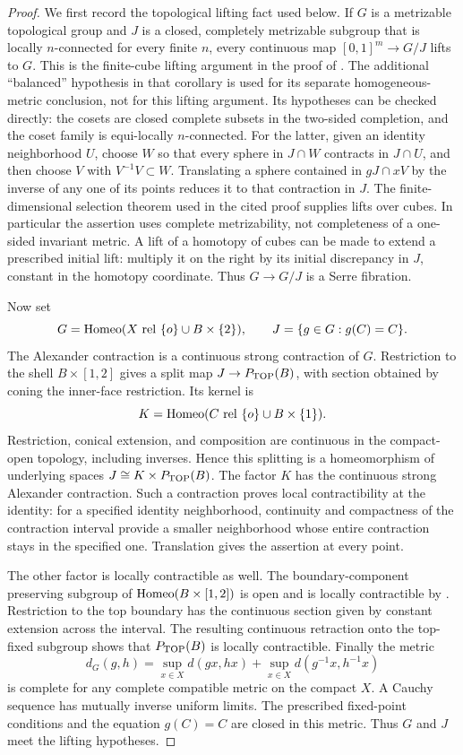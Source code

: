 \begin{proof}
We first record the topological lifting fact used below. If $G$ is a
metrizable topological group and $J$ is a closed, completely metrizable
subgroup that is locally $n$-connected for every finite $n$, every
continuous map $[0,1]^m\to G/J$ lifts to $G$. This is the finite-cube
lifting argument in the proof of
\cite[Corollary~2.2, pp.~4--5]{BanakhRepovs2010}. The additional
``balanced'' hypothesis in that corollary is used for its separate
homogeneous-metric conclusion, not for this lifting argument. Its
hypotheses can be checked directly: the cosets are closed complete
subsets in the two-sided completion, and the coset family is equi-locally
$n$-connected. For the latter, given an identity neighborhood $U$, choose
$W$ so that every sphere in $J\cap W$ contracts in $J\cap U$, and then
choose $V$ with $V^{-1}V\subset W$. Translating a sphere contained in
$gJ\cap xV$ by the inverse of any one of its points reduces it to that
contraction in $J$. The finite-dimensional selection theorem used in
the cited proof supplies lifts over cubes. In particular the assertion
uses complete metrizability, not completeness of a one-sided invariant
metric. A lift of a homotopy of cubes can be made to extend a prescribed
initial lift: multiply it on the right by its initial discrepancy in
$J$, constant in the homotopy coordinate. Thus $G\to G/J$ is a Serre
fibration.

Now set
\[
 G=\Homeo(X\ \mathrm{rel}\ \{o\}\cup B\times\{2\}),
 \qquad J=\{g\in G:g(C)=C\}.
\]
The Alexander contraction is a continuous strong contraction of $G$.
Restriction to the shell $B\times[1,2]$ gives a split map
$J\to P_{\rm TOP}(B)$, with section obtained by coning the inner-face
restriction. Its kernel is
\[
 K=\Homeo(C\ \mathrm{rel}\ \{o\}\cup B\times\{1\}).
\]
Restriction, conical extension, and composition are continuous in the
compact-open topology, including inverses. Hence this splitting is a
homeomorphism of underlying spaces $J\cong K\times P_{\rm TOP}(B)$.
The factor $K$ has the continuous strong Alexander contraction.
Such a contraction proves local contractibility at the identity:
for a specified identity neighborhood, continuity and compactness of
the contraction interval provide a smaller neighborhood whose entire
contraction stays in the specified one. Translation gives the assertion
at every point.

The other factor is locally contractible as well. The boundary-component
preserving subgroup of $\operatorname{Homeo}(B\times[1,2])$ is open and is locally
contractible by \cite[Corollary~1.1, p.~63]{EdwardsKirby1971}.
Restriction to the top boundary has the continuous section given by
constant extension across the interval. The resulting continuous
retraction onto the top-fixed subgroup shows that $P_{\rm TOP}(B)$
is locally contractible. Finally the metric
\[
 d_G(g,h)=\sup_{x\in X}d(gx,hx)
           +\sup_{x\in X}d(g^{-1}x,h^{-1}x)
\]
is complete for any complete compatible metric on the compact $X$.
A Cauchy sequence has mutually inverse uniform limits. The prescribed
fixed-point conditions and the equation $g(C)=C$ are closed in this
metric. Thus $G$ and $J$ meet the lifting hypotheses.


\end{proof}
